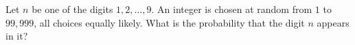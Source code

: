 Let $n$ be one of the digits $1,2,\dots,9$. An integer is chosen at random from $1$ to $99{,}999$, all choices equally likely. What is the probability that the digit $n$ appears in it?
